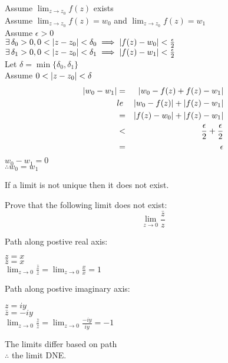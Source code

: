 \documentclass[letterpaper,12pt,fleqn]{article}
\newcommand{\e}{\epsilon}
\renewcommand{\d}{\delta}
\begin{document}
\begin{theproof}
  Assume $\lim_{z\to z_0}f(z)$ exists \\
  Assume $\lim_{z\to z_0}f(z)=w_0$ and $\lim_{z\to z_0}f(z)=w_1$ \\
  Assume $\e>0$ \\
  $\exists\,\d_0>0,0<\abs{z-z_0}<\d_0\implies\abs{f(z)-w_0}<\frac{\e}{2}$ \\
  $\exists\,\d_1>0,0<\abs{z-z_0}<\d_1\implies\abs{f(z)-w_1}<\frac{\e}{2}$ \\
  Let $\d=\min\{\d_0,\d_1\}$ \\
  Assume $0<\abs{z-z_0}<\d$ \\
  \begin{eqnarray*}
    \abs{w_0-w_1} &=& \abs{w_0-f(z)+f(z)-w_1} \\
    &le& \abs{w_0-f(z)}+\abs{f(z)-w_1} \\
    &=& \abs{f(z)-w_0}+\abs{f(z)-w_1} \\
    &<& \frac{\e}{2}+\frac{\e}{2} \\
    &=& \e \\
  \end{eqnarray*}
  $w_0-w_1=0$ \\
  $\therefore w_0=w_1$
\end{theproof}

\begin{corollary}
  If a limit is not unique then it does not exist.
\end{corollary}

\begin{example}
  Prove that the following limit does not exist:
  \[\lim_{z\to0}\frac{\bar{z}}{z}\]

  Path along postive real axis:

  $z=x$ \\
  $\bar{z}=x$ \\
  $\lim_{z\to0}\frac{\bar{z}}{z}=\lim_{z\to0}\frac{x}{x}=1$

  Path along postive imaginary axis:

  $z=iy$ \\
  $\bar{z}=-iy$ \\
  $\lim_{z\to0}\frac{\bar{z}}{z}=\lim_{z\to0}\frac{-iy}{iy}=-1$

  The limits differ based on path \\
  $\therefore$ the limit DNE.
\end{example}
\end{document}
